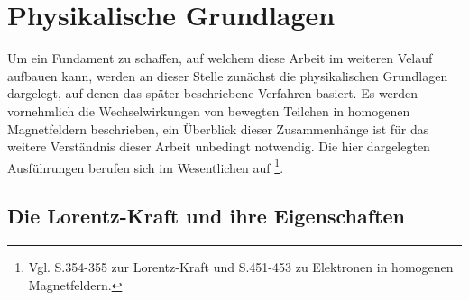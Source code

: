 \chapter{Physikalische Grundlagen}

Um ein Fundament zu schaffen, auf welchem diese Arbeit im weiteren Velauf aufbauen kann, werden
an dieser Stelle zun\"achst die physikalischen Grundlagen dargelegt, auf denen das sp\"ater beschriebene
Verfahren basiert. Es werden vornehmlich die Wechselwirkungen von bewegten Teilchen in homogenen
Magnetfeldern beschrieben, ein \"Uberblick dieser Zusammenh\"ange ist f\"ur das weitere Verst\"andnis
dieser Arbeit unbedingt notwendig. Die hier dargelegten Ausf\"uhrungen berufen sich im Wesentlichen auf \cite{Vog99}
\footnote{Vgl. S.354-355 zur Lorentz-Kraft und S.451-453 zu Elektronen in homogenen Magnetfeldern.}.

\section{Die Lorentz-Kraft und ihre Eigenschaften}
\label{sec:lorentz}

